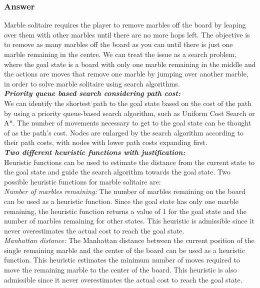 \documentclass[15pt,journal]{IEEEtran}
\begin{document}
\subsubsection{\Large{\textbf{Answer}}\\}
Marble solitaire requires the player to remove marbles off the board by leaping over them with other marbles until there are no more hops left. The objective is to remove as many marbles off the board as you can until there is just one marble remaining in the centre. We can treat the issue as a search problem, where the goal state is a board with only one marble remaining in the middle and the actions are moves that remove one marble by jumping over another marble, in order to solve marble solitaire using search algorithms. \\
\vspace{2mm}
\textbf{\textit{Priority queue based search considering path cost:}} \\
We can identify the shortest path to the goal state based on the cost of the path by using a priority queue-based search algorithm, such as Uniform Cost Search or A*. The number of movements necessary to get to the goal state can be thought of as the path's cost. Nodes are enlarged by the search algorithm according to their path costs, with nodes with lower path costs expanding first.
\\
\textbf{\textit{Two different heuristic functions with justification:}} \\
\cite{uninformed}Heuristic functions can be used to estimate the distance from the current state to the goal state and guide the search algorithm towards the goal state. Two possible heuristic functions for marble solitaire are:\\
\textit{Number of marbles remaining: }The number of marbles remaining on the board can be used as a heuristic function. Since the goal state has only one marble remaining, the heuristic function returns a value of 1 for the goal state and the number of marbles remaining for other states. This heuristic is admissible since it never overestimates the actual cost to reach the goal state. \\
\textit{Manhattan distance:} \cite{uninformed}The Manhattan distance between the current position of the single remaining marble and the center of the board can be used as a heuristic function. This heuristic estimates the minimum number of moves required to move the remaining marble to the center of the board. This heuristic is also admissible since it never overestimates the actual cost to reach the goal state. \\
\end{document}
